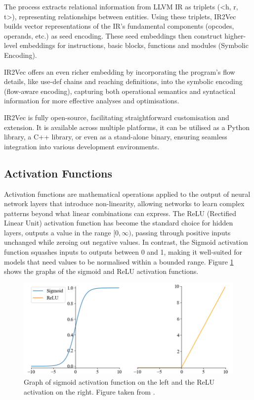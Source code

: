 The process extracts relational information from LLVM IR as triplets (<h, r, t>), representing relationships between entities. Using these triplets, IR2Vec builds vector representations of the IR's fundamental components (opcodes, operands, etc.) as seed encoding. These seed embeddings then construct higher-level embeddings for instructions, basic blocks, functions and modules (Symbolic Encoding).

IR2Vec offers an even richer embedding by incorporating the program's flow details, like use-def chains and reaching definitions, into the symbolic encoding (flow-aware encoding), capturing both operational semantics and syntactical information for more effective analyses and optimisations.

IR2Vec is fully open-source, facilitating straightforward customisation and extension. It is available across multiple platforms, it can be utilised as a Python library, a C++ library, or even as a stand-alone binary, ensuring seamless integration into various development environments.

\subsection{Activation Functions}
Activation functions are mathematical operations applied to the output of neural network layers that introduce non-linearity, allowing networks to learn complex patterns beyond what linear combinations can express. The ReLU (Rectified Linear Unit) activation function has become the standard choice for hidden layers, outputs a value in the range $[0, \infty )$, passing through positive inputs unchanged while zeroing out negative values. In contrast, the Sigmoid activation function squashes inputs to outputs between 0 and 1, making it well-suited for models that need values to be normalised within a bounded range. Figure \ref{fig:SigmoidReluGraph} shows the graphs of the sigmoid and ReLU activation functions.

\begin{figure}[h!]
\centering
\includegraphics[scale=0.45]{Figures/SigmoidRELUActivationFunction.png}
\caption{Graph of sigmoid activation function on the left and the ReLU activation on the right. Figure taken from  \cite{SIgmoidRELUGraph}.}\label{fig:SigmoidReluGraph}
\end{figure}


